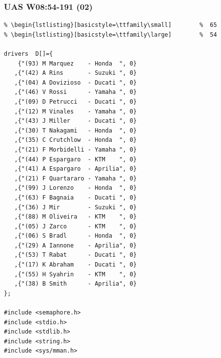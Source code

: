 \documentclass[aspectratio=169, xcolor=table, notheorems, hyperref={pdfpagelabels=false}]{beamer}
\begin{document}
\begin{frame}[fragile]
\frametitle{UAS W08:54-191 (02)}
\begin{lstlisting}[basicstyle=\ttfamily\tiny]         % 108
% \begin{lstlisting}[basicstyle=\ttfamily\footnotesize] %  72
% \begin{lstlisting}[basicstyle=\ttfamily\small]        %  65
% \begin{lstlisting}[basicstyle=\ttfamily\large]        %  54

drivers  D[]={
    {"(93) M Marquez    - Honda  ", 0}
   ,{"(42) A Rins       - Suzuki ", 0}
   ,{"(04) A Dovizioso  - Ducati ", 0}
   ,{"(46) V Rossi      - Yamaha ", 0}
   ,{"(09) D Petrucci   - Ducati ", 0}
   ,{"(12) M Vinales    - Yamaha ", 0}
   ,{"(43) J Miller     - Ducati ", 0}
   ,{"(30) T Nakagami   - Honda  ", 0}
   ,{"(35) C Crutchlow  - Honda  ", 0}
   ,{"(21) F Morbidelli - Yamaha ", 0}
   ,{"(44) P Espargaro  - KTM    ", 0}
   ,{"(41) A Espargaro  - Aprilia", 0}
   ,{"(21) F Quartararo - Yamaha ", 0}
   ,{"(99) J Lorenzo    - Honda  ", 0}
   ,{"(63) F Bagnaia    - Ducati ", 0}
   ,{"(36) J Mir        - Suzuki ", 0}
   ,{"(88) M Oliveira   - KTM    ", 0}
   ,{"(05) J Zarco      - KTM    ", 0}
   ,{"(06) S Bradl      - Honda  ", 0}
   ,{"(29) A Iannone    - Aprilia", 0}
   ,{"(53) T Rabat      - Ducati ", 0}
   ,{"(17) K Abraham    - Ducati ", 0}
   ,{"(55) H Syahrin    - KTM    ", 0}
   ,{"(38) B Smith      - Aprilia", 0}
};

#include <semaphore.h>
#include <stdio.h>
#include <stdlib.h>
#include <string.h>
#include <sys/mman.h>

\end{lstlisting}
\end{frame}
\end{document}
